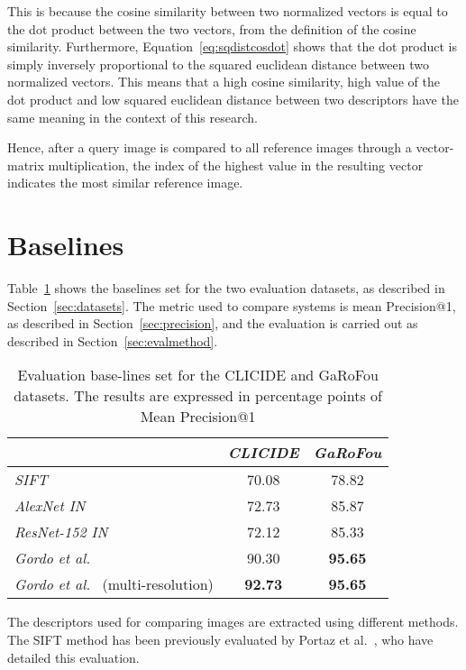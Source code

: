 This is because the cosine similarity between two normalized vectors is
equal to the dot product between the two vectors, from the definition
of the cosine similarity. Furthermore, Equation~\ref{eq:sqdistcosdot} shows
that the dot product is simply inversely proportional to the squared
euclidean distance between two normalized vectors.
This means that a high cosine similarity, high value of the dot product
and low squared euclidean distance between two descriptors have the
same meaning in the context of this research.

Hence, after a query image is compared to all reference images through
a vector-matrix multiplication, the index of the highest value in the
resulting vector indicates the most similar reference image.

\section{Baselines}\label{sec:baselines}
Table~\ref{tab:baselines} shows the baselines set for the two evaluation
datasets, as described in Section~\ref{sec:datasets}. The metric used
to compare systems is mean Precision@1, as described in
Section~\ref{sec:precision}, and the evaluation is carried out as
described in Section~\ref{sec:evalmethod}.

\begin{table}
\begin{tabular}{|l|c|c|}
\hline & \emph{CLICIDE} & \emph{GaRoFou}\\
\hline \emph{SIFT} & 70.08 & 78.82\\
\hline \emph{AlexNet IN} & 72.73 & 85.87\\
\hline \emph{ResNet-152 IN} & 72.12 & 85.33\\
\hline \emph{Gordo et al.}~\cite{gordo_deep_2016} & 90.30 & \textbf{95.65}\\
\hline \emph{Gordo et al.}~\cite{gordo_deep_2016} (multi-resolution)
& \textbf{92.73} & \textbf{95.65}\\
\hline
\end{tabular}
\caption{Evaluation base-lines set for the CLICIDE and GaRoFou datasets.
The results are expressed in percentage points of
Mean Precision@1\label{tab:baselines}}
\end{table}

The descriptors used for comparing images are extracted using different
methods.
The SIFT method has been previously evaluated by
Portaz et al.~\cite{portaz_construction_2017}, who have detailed this
evaluation.

